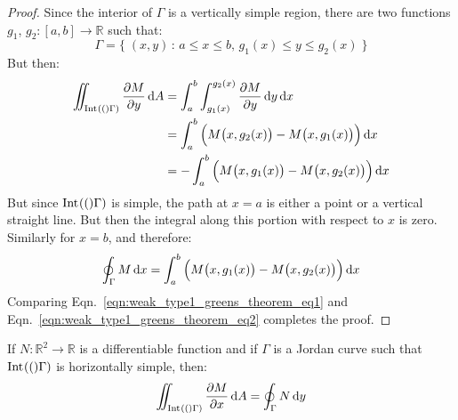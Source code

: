     \begin{proof}
        Since the interior of $\Gamma$ is a vertically simple region,
        there are two functions
        $g_{1}$, $g_{2}:[a,b]\rightarrow\mathbb{R}$ such that:
        \begin{equation}
            \Gamma=\{\;(x,y)\,:\,a\leq{x}\leq{b},\,
                                 g_{1}(x)\leq{y}\leq{g}_{2}(x)\;\}
        \end{equation}
        But then:
        \begin{subequations}
            \label{eqn:weak_type1_greens_theorem_eq1}%
            \begin{align}
                \iint_{\interior[](\Gamma)}
                    \frac{\partial{M}}{\partial{y}}\diff{A}
                &=\int_{a}^{b}\int_{g_{1}(x)}^{g_{2}(x)}
                    \frac{\partial{M}}{\partial{y}}
                    \diff{y}\diff{x}\\
                &=\int_{a}^{b}
                    \Big(M\big(x,g_{2}(x)\big)
                    -M\big(x,g_{1}(x)\big)\Big)\diff{x}\\
                &=-\int_{a}^{b}
                    \Big(M\big(x,g_{1}(x)\big)
                    -M\big(x,g_{2}(x)\big)\Big)\diff{x}
            \end{align}
        \end{subequations}
        But since $\interior[](\Gamma)$ is simple, the path at $x=a$ is either a
        point or a vertical straight line. But then the integral along
        this portion with respect to $x$ is zero. Similarly for
        $x=b$, and therefore:
        \begin{equation}
            \label{eqn:weak_type1_greens_theorem_eq2}%
            \oint_{\Gamma}M\diff{x}
            =\int_{a}^{b}\Big(M\big(x,g_{1}(x)\big)
                -M\big(x,g_{2}(x)\big)\Big)\diff{x}
        \end{equation}
        Comparing Eqn.~\ref{eqn:weak_type1_greens_theorem_eq1}
        and Eqn.~\ref{eqn:weak_type1_greens_theorem_eq2}
        completes the proof.
    \end{proof}
    \begin{theorem}
        \label{thm:Greens_Theorem_Simple_t2_region}%
        If $N:\mathbb{R}^{2}\rightarrow\mathbb{R}$ is a differentiable
        function and if $\Gamma$ is a Jordan curve such that
        $\interior[](\Gamma)$ is horizontally simple, then:
        \begin{equation}
            \iint_{\interior[](\Gamma)}\frac{\partial{M}}{\partial{x}}\diff{A}
            =\oint_{\Gamma}N\diff{y}
        \end{equation}
    \end{theorem}

